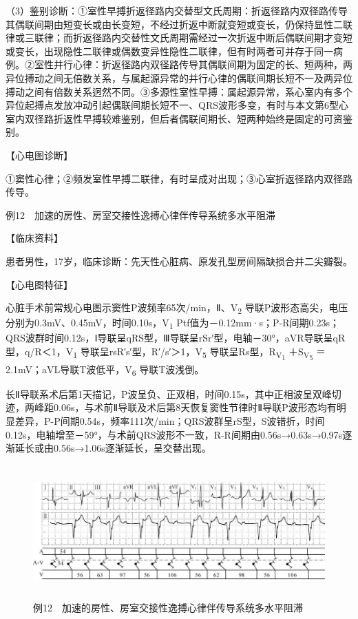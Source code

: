 （3）鉴别诊断：①室性早搏折返径路内交替型文氏周期：折返径路内双径路传导其偶联间期由短变长或由长变短，不经过折返中断就变短或变长，仍保持显性二联律或三联律；而折返径路内交替性文氏周期需经过一次折返中断后偶联间期才变短或变长，出现隐性二联律或偶数变异性隐性二联律，但有时两者可并存于同一病例。②室性并行心律：折返径路内双径路传导其偶联间期为固定的长、短两种，两异位搏动之间无倍数关系，与属起源异常的并行心律的偶联间期长短不一及两异位搏动之间有倍数关系迥然不同。③多源性室性早搏：属起源异常，系心室内有多个异位起搏点发放冲动引起偶联间期长短不一、QRS波形多变，有时与本文第6型心室内双径路折返性早搏较难鉴别，但后者偶联间期长、短两种始终是固定的可资鉴别。

【心电图诊断】

①窦性心律；②频发室性早搏二联律，有时呈成对出现；③心室折返径路内双径路传导。

例12　加速的房性、房室交接性逸搏心律伴传导系统多水平阻滞

【临床资料】

患者男性，17岁，临床诊断：先天性心脏病、原发孔型房间隔缺损合并二尖瓣裂。

【心电图特征】

心脏手术前常规心电图示窦性P波频率65次/min，Ⅱ、V\textsubscript{2}
导联P波形态高尖，电压分别为0.3mV、0.45mV，时间0.10s，V\textsubscript{1}
Ptf值为－0.12mm·s；P-R间期0.23s；QRS波群时间0.12s，Ⅰ导联呈qRS型，Ⅲ导联呈rSr′型，电轴－30°，aVR导联呈qR型，q/R＜1，V\textsubscript{1}
导联呈rsR′s′型，R′/s′＞1，V\textsubscript{5}
导联呈Rs型，R\textsubscript{V\textsubscript{1}}
＋S\textsubscript{V\textsubscript{5}}
＝2.1mV；aVL导联T波低平，V\textsubscript{6} 导联T波浅倒。

长Ⅱ导联系术后第1天描记，P波呈负、正双相，时间0.15s，其中正相波呈双峰切迹，两峰距0.06s，与术前Ⅱ导联及术后第8天恢复窦性节律时Ⅱ导联P波形态均有明显差异，P-P间期0.54s，频率111次/min；QRS波群呈rS型，S波错折，时间0.12s，电轴增至－59°，与术前QRS波形不一致，R-R间期由0.56s→0.63s→0.97s逐渐延长或由0.56s→1.06s逐渐延长，呈交替出现。

\begin{figure}[!htbp]
 \centering
 \includegraphics[width=5.96875in,height=2.02083in]{./images/Image00770.jpg}
 \captionsetup{justification=centering}
 \caption{例12　加速的房性、房室交接性逸搏心律伴传导系统多水平阻滞}
 \label{fig50-12}
  \end{figure} 

